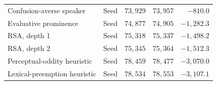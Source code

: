 \begin{table}[tbp]
\begin{tabular}{@{}llrrr@{}}
Confusion-averse speaker & Seed & $73{,}929$ & $73{,}957$ & $-810.0$ \\
Evaluative prominence & Seed & $74{,}877$ & $74{,}905$ & $-1{,}282.3$ \\
RSA, depth 1 & Seed & $75{,}318$ & $75{,}337$ & $-1{,}498.2$ \\
RSA, depth 2 & Seed & $75{,}345$ & $75{,}364$ & $-1{,}512.3$ \\
Perceptual-oddity heuristic & Seed & $78{,}459$ & $78{,}477$ & $-3{,}070.0$ \\
Lexical-preemption heuristic & Seed & $78{,}534$ & $78{,}553$ & $-3{,}107.1$ \\
\bottomrule
\end{tabular}
\end{table}
